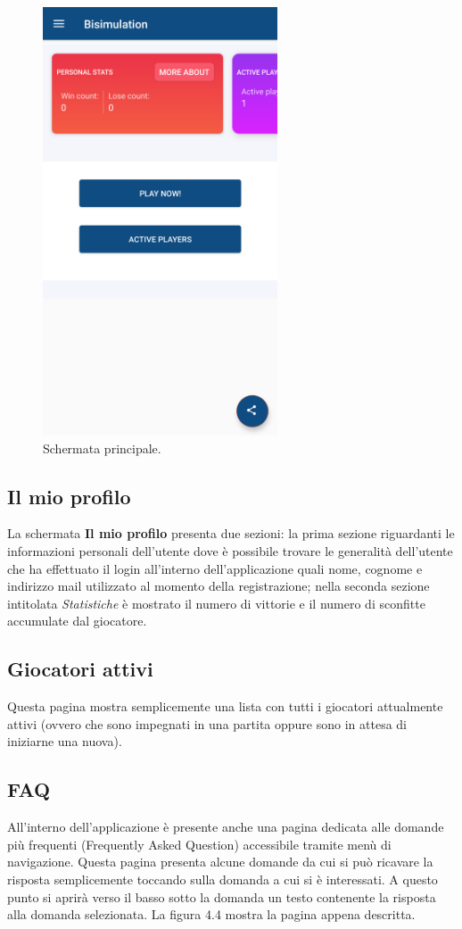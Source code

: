 \documentclass[a4paper,11pt,twoside,openright]{report}
\begin{document}
\begin{figure}[h]
\centering
\includegraphics[width=\linewidth,height=360pt,keepaspectratio]{images/Home.png}
\caption{Schermata principale.}
\end{figure}

\subsection{Il mio profilo}
La schermata \textbf{Il mio profilo} presenta due sezioni: la prima sezione riguardanti le informazioni personali dell'utente dove è possibile trovare le generalità dell'utente
 che ha effettuato il login all'interno dell'applicazione quali nome, cognome e indirizzo mail utilizzato al momento della registrazione; nella seconda sezione intitolata \textit{Statistiche}
è mostrato il numero di vittorie e il numero di sconfitte accumulate dal giocatore.

\subsection{Giocatori attivi}
Questa pagina mostra semplicemente una lista con tutti i giocatori attualmente attivi (ovvero che sono impegnati in una partita oppure sono in attesa di iniziarne una nuova).

\subsection{FAQ}
All'interno dell'applicazione è presente anche una pagina dedicata alle domande più frequenti (Frequently Asked Question) accessibile tramite menù di navigazione.
Questa pagina presenta alcune domande da cui si può ricavare la risposta semplicemente toccando sulla domanda a cui si è interessati. A questo punto si aprirà verso il basso
sotto la domanda un testo contenente la risposta alla domanda selezionata. La figura 4.4 mostra la pagina appena descritta.
\end{document}
